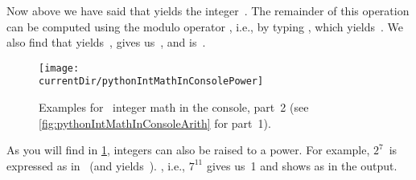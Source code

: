 Now above we have said that  yields the integer~.
The remainder of this operation can be computed using the modulo operator \expandafter\pythonilIdx{\%}, i.e., by typing , which yields~.
We also find that \expandafter{} yields~, \expandafter{} gives us~, and \expandafter{} is~.

\begin{figure}%
\centering%
\texttt{[image: \\currentDir/pythonIntMathInConsolePower]}%
\caption{Examples for \python\ integer math in the console, part~2 (see \cref{fig:pythonIntMathInConsoleArith} for part~1).}%
\label{fig:pythonIntMathInConsolePower}%
\end{figure}%

As you will find in \cref{fig:pythonIntMathInConsolePower}, integers can also be raised to a power.
For example, $2^7$~is expressed as \pythonIdx{**} in \python\ (and yields~).
, i.e., $7^{11}$ gives us~1 and shows as  in the output.

